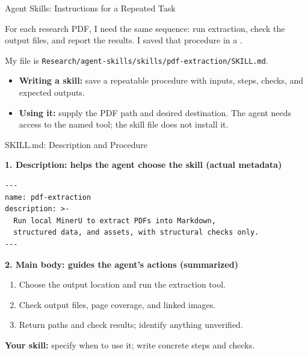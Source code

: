 \begin{frame}{Agent Skills: Instructions for a Repeated Task}
\small
{}\par\smallskip
For each research PDF, I need the same sequence: run extraction, check the output files, and report the results. I saved that procedure in a .
\begin{figure}\centering
{}
\end{figure}
My file is \texttt{Research/agent-skills/skills/pdf-extraction/SKILL.md}.
\par\smallskip
\begin{itemize}
\item \textbf{Writing a skill:} save a repeatable procedure with inputs, steps, checks, and expected outputs.
\item \textbf{Using it:} supply the PDF path and desired destination. The agent needs access to the named tool; the skill file does not install it.
\end{itemize}
\end{frame}

\begin{frame}[fragile]{SKILL.md: Description and Procedure}
\small
{}\par\smallskip
\textbf{1. Description: helps the agent choose the skill (actual metadata)}
\begin{verbatim}
---
name: pdf-extraction
description: >-
  Run local MinerU to extract PDFs into Markdown,
  structured data, and assets, with structural checks only.
---
\end{verbatim}
\textbf{2. Main body: guides the agent's actions (summarized)}
\begin{enumerate}
\item Choose the output location and run the extraction tool.
\item Check output files, page coverage, and linked images.
\item Return paths and check results; identify anything unverified.
\end{enumerate}
\textbf{Your skill:} specify when to use it; write concrete steps and checks.
\end{frame}


